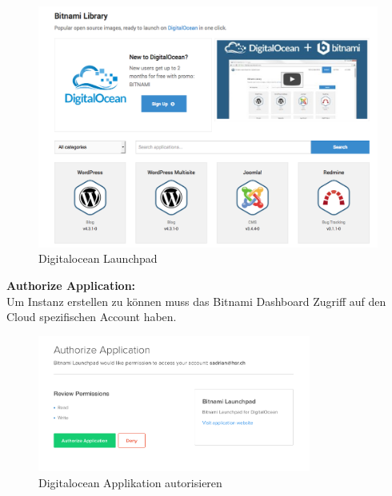 \begin{figure}[!htbp]
\includegraphics[width=\textwidth]{./03_Analyse/03_Bitnami/images/digitalocean_launchpad}
\caption{Digitalocean Launchpad}
\end{figure}

\newpage
\textbf{Authorize Application:}\\
Um Instanz erstellen zu können muss das Bitnami Dashboard Zugriff auf 
den Cloud spezifischen Account haben.

\begin{figure}[!htbp]
\includegraphics[width=0.8\textwidth]{./03_Analyse/03_Bitnami/images/digitalocean_authorize}
\caption{Digitalocean Applikation autorisieren}
\end{figure}




